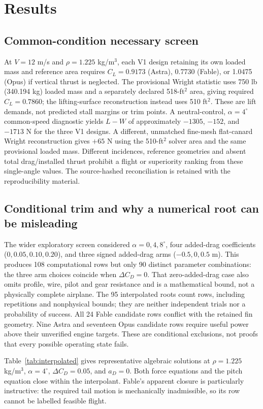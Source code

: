 \documentclass[10pt,letterpaper]{article}
\begin{document}
\section{Results}
\subsection{Common-condition necessary screen}
At $V=12$ m/s and $\rho=1.225$ kg/m$^3$, each V1 design retaining its own loaded mass and reference area requires $C_L=0.9173$ (Astra), 0.7730 (Fable), or 1.0475 (Opus) if vertical thrust is neglected. The provisional Wright statistic uses 750 lb (340.194 kg) loaded mass and a separately declared 518-ft$^2$ area, giving required $C_L=0.7860$; the lifting-surface reconstruction instead uses 510 ft$^2$. These are lift demands, not predicted stall margins or trim points. A neutral-control, $\alpha=4^\circ$ common-speed diagnostic yields $L-W$ of approximately $-1305$, $-152$, and $-1713$ N for the three V1 designs. A different, unmatched fine-mesh flat-canard Wright reconstruction gives $+65$ N using the 510-ft$^2$ solver area and the same provisional loaded mass. Different incidences, reference geometries and absent total drag/installed thrust prohibit a flight or superiority ranking from these single-angle values. The source-hashed reconciliation is retained with the reproducibility material.

\subsection{Conditional trim and why a numerical root can be misleading}
The wider exploratory screen considered $\alpha=0,4,8^\circ$, four added-drag coefficients ($0,0.05,0.10,0.20$), and three signed added-drag arms ($-0.5,0,0.5$ m). This produces 108 computational rows but only 90 distinct parameter combinations: the three arm choices coincide when $\Delta C_D=0$. That zero-added-drag case also omits profile, wire, pilot and gear resistance and is a mathematical bound, not a physically complete airplane. The 95 interpolated roots count rows, including repetitions and nonphysical bounds; they are neither independent trials nor a probability of success. All 24 Fable candidate rows conflict with the retained fin geometry. Nine Astra and seventeen Opus candidate rows require useful power above their unverified engine targets. These are conditional exclusions, not proofs that every possible operating state fails.

Table~\ref{tab:interpolated} gives representative algebraic solutions at $\rho=1.225$ kg/m$^3$, $\alpha=4^\circ$, $\Delta C_D=0.05$, and $a_D=0$. Both force equations and the pitch equation close within the interpolant. Fable's apparent closure is particularly instructive: the required tail motion is mechanically inadmissible, so its row cannot be labelled feasible flight.
\end{document}
